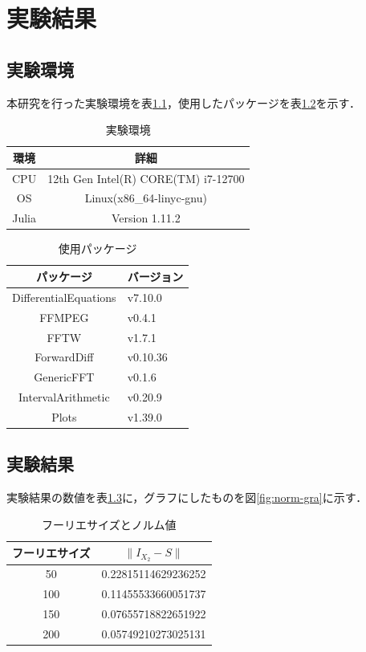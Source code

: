 \chapter{実験結果}
\section{実験環境}
本研究を行った実験環境を表\ref{tab:環境}，使用したパッケージを表\ref{tab:パッケージ}を示す．

\begin{table}[h]
  \centering
  \caption{実験環境}
  \label{tab:環境}
  \begin{tabular}{c||c}
    環境 & 詳細 \\ \hline
    CPU & 12th Gen Intel(R) CORE(TM) i7-12700 \\
    OS & Linux(x86_64-linyc-gnu)\\
    Julia & Version 1.11.2
  \end{tabular}
\end{table}

\begin{table}[h]
  \centering
  \caption{使用パッケージ}
  \label{tab:パッケージ}
  \begin{tabular}{c||l}
    パッケージ & バージョン \\  \hline
    DifferentialEquations & v7.10.0 \\
    FFMPEG & v0.4.1 \\
    FFTW & v1.7.1 \\
    ForwardDiff & v0.10.36 \\
    GenericFFT & v0.1.6 \\
    IntervalArithmetic & v0.20.9 \\
    Plots & v1.39.0
  \end{tabular}
\end{table}

\section{実験結果}
実験結果の数値を表\ref{tab:norm-num}に，グラフにしたものを図\ref{fig:norm-gra}に示す．

\begin{table}[htbp]
  \centering
  \caption{フーリエサイズとノルム値}
  \label{tab:norm-num}
  \begin{tabular}{c||c}
    フーリエサイズ & $\| I_{X_2}-S \|$ \\ \hline
    50 & 0.22815114629236252 \\
    100&0.11455533660051737\\
    150&0.07655718822651922\\
    200&0.05749210273025131
\end{tabular}
\end{table}

